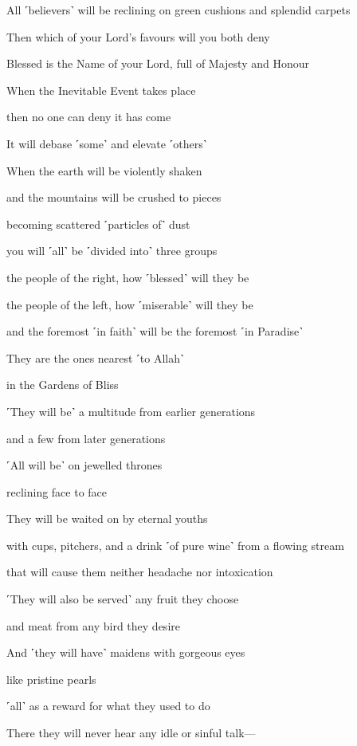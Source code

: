 All ˹believers˺ will be reclining on green cushions and splendid carpets

Then which of your Lord’s favours will you both deny

Blessed is the Name of your Lord, full of Majesty and Honour

When the Inevitable Event takes place

then no one can deny it has come

It will debase ˹some˺ and elevate ˹others˺

When the earth will be violently shaken

and the mountains will be crushed to pieces

becoming scattered ˹particles of˺ dust

you will ˹all˺ be ˹divided into˺ three groups

the people of the right, how ˹blessed˺ will they be

the people of the left, how ˹miserable˺ will they be

and the foremost ˹in faith˺ will be the foremost ˹in Paradise˺

They are the ones nearest ˹to Allah˺

in the Gardens of Bliss

˹They will be˺ a multitude from earlier generations

and a few from later generations

˹All will be˺ on jewelled thrones

reclining face to face

They will be waited on by eternal youths

with cups, pitchers, and a drink ˹of pure wine˺ from a flowing stream

that will cause them neither headache nor intoxication

˹They will also be served˺ any fruit they choose

and meat from any bird they desire

And ˹they will have˺ maidens with gorgeous eyes

like pristine pearls

˹all˺ as a reward for what they used to do

There they will never hear any idle or sinful talk—

